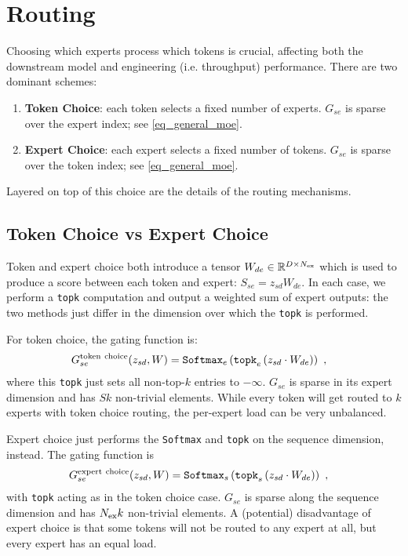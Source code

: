 \section{Routing}


Choosing which experts process which tokens is crucial, affecting both the downstream model and
engineering (i.e. throughput) performance.  There are two dominant schemes:
\begin{enumerate}
    \item \textbf{Token Choice}: each token selects a fixed number of experts. $ G _{ se } $
         is sparse over the expert index; see \eqref{eq_general_moe}.
    \item \textbf{Expert Choice}: each expert selects a fixed number of tokens. $ G _{ se } $ is
        sparse over the token index; see \eqref{eq_general_moe}.
\end{enumerate}
Layered on top of this choice are the details of the routing mechanisms.

\subsection{Token Choice vs Expert Choice}

Token and expert choice both introduce a tensor $W _{ de } \in \mathbb{R} ^{ D\times N _{ {\rm  ex}
} }$ which is used to produce a score between each token and expert: $ S _{ se } = z _{ sd } W _{ de
} $. In each case, we perform a \texttt{topk} computation and output a weighted sum of expert
outputs: the two methods just differ in the dimension over which the \texttt{topk} is performed.

For token choice, the gating function is:
\begin{align}
    G  ^{ {\rm  token\ choice} }_{ se }(z _{ sd }, W)  &= \texttt{Softmax}_{ e } \left ( \texttt{topk} _{ e } \left ( z _{ sd } \cdot W _{ de }  \right ) \right ) \ , \label{eq_token_choice}
\end{align}
where this \texttt{topk} just sets all non-top-$ k $ entries to $ -\infty $. $ G _{ se } $
is sparse in its expert dimension and has $ Sk $ non-trivial elements. While every token will get
routed to $ k $ experts with token choice routing, the per-expert load can be very unbalanced.

Expert choice just performs the \texttt{Softmax} and \texttt{topk} on the sequence dimension,
instead.  The gating function is
\begin{align}
    G  ^{ {\rm  expert\ choice} }_{ se }(z _{ sd }, W)  &= \texttt{Softmax}_{ s } \left ( \texttt{topk} _{ s } \left ( z _{ sd } \cdot W _{ de }  \right ) \right ) \ , \label{eq_expert_choice}
\end{align}
with \texttt{topk} acting as in the token choice case. $G _{ se } $ is sparse along the sequence
dimension and has $ N _{ {\rm ex} }k $ non-trivial elements. A (potential) disadvantage of expert
choice is that some tokens will not be routed to any expert at all, but every expert has an equal
load.







